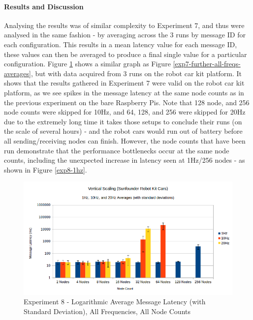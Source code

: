 \documentclass[../dissertation.tex]{subfiles}
\begin{document}
\paragraph{Results and Discussion} Analysing the results was of similar complexity to Experiment 7, and thus were analysed in the same fashion - by averaging across the 3 runs by message ID for each configuration. This results in a mean latency value for each message ID, these values can then be averaged to produce a final single value for a particular configuration. Figure \ref{exp8-all-freqs-averages} shows a similar graph as Figure \ref{exp7-further-all-freqs-averages}, but with data acquired from 3 runs on the robot car kit platform. It shows that the results gathered in Experiment 7 were valid on the robot car kit platform, as we see spikes in the message latency at the same node counts as in the previous experiment on the bare Raspberry Pis. Note that 128 node, and 256 node counts were skipped for 10Hz, and 64, 128, and 256 were skipped for 20Hz due to the extremely long time it takes those setups to conclude their runs (on the scale of several hours) - and the robot cars would run out of battery before all sending/receiving nodes can finish. However, the node counts that have been run demonstrate that the performance bottlenecks occur at the same node counts, including the unexpected increase in latency seen at 1Hz/256 nodes - as shown in Figure \ref{exp8-1hz}.

\begin{figure}[H]
\centering
\includegraphics[width=\textwidth]{images/experiment9/vertical_scaling_all_freqs_log_avg_msg_latency.png}
\caption{Experiment 8 - Logarithmic Average Message Latency (with Standard Deviation), All Frequencies, All Node Counts}
\label{exp8-all-freqs-averages}
\end{figure}
\end{document}

